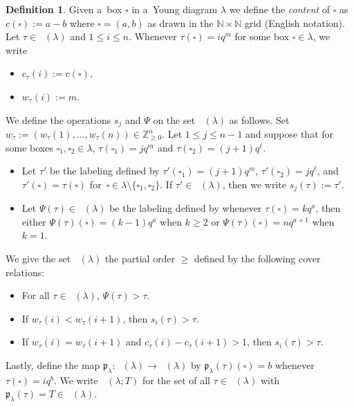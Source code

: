 \documentclass[pdftex]{sigma}
\numberwithin{equation}{section}
\theoremstyle{definition}
\newtheorem{Definition}[Theorem]{Definition}
\DeclareMathOperator{\RYT}{\mathrm{RYT}_{\geq 0}}
\DeclareMathOperator{\PSYT}{\mathrm{PSYT}_{\geq 0}}
\begin{document}
\begin{Definition}\label{ordering and operations on tableaux defs}
Given a~box $\square$ in a~Young diagram $\lambda$ we define the \textit{content} of $\square$ as $c(\square) := a-b$ where $\square = (a,b)$ as drawn in the $\mathbb{N}\times \mathbb{N}$ grid (English notation). Let $\tau \in \PSYT(\lambda)$ and $1\leq i\leq n$. Whenever $\tau(\square) = iq^{m}$ for some box $\square \in \lambda$, we write
\begin{itemize}
\itemsep=0pt
 \item $c_{\tau}(i):= c(\square)$,
 \item $w_{\tau}(i):= m$.
\end{itemize}

We define the operations $s_j$ and $\Psi$ on the set $\PSYT(\lambda)$ as follows. Set $w_{\tau}:= (w_{\tau}(1),\dots,\allowbreak w_{\tau}(n)) \in \mathbb{Z}^{n}_{\geq0}$. Let $1\leq j \leq n-1$ and suppose that for some boxes $\square_1,\square_2 \in \lambda$, $\tau(\square_1) = jq^m$ and $\tau(\square_2) = (j+1)q^{\ell}$.
\begin{itemize}
\itemsep=0pt
 \item Let $\tau'$ be the labeling defined by $\tau'(\square_1) = (j+1)q^m$, $\tau'(\square_2) = jq^{\ell}$, and $\tau'(\square) = \tau(\square)$ for~${\square \in \lambda \setminus \{\square_1,\square_2\}}$. If $\tau' \in \PSYT(\lambda)$, then we write $s_j(\tau):= \tau'$.
 \item Let $\Psi(\tau) \in \PSYT(\lambda)$ be the labeling defined by whenever $\tau(\square) = kq^a$, then either $\Psi(\tau)(\square) = (k-1)q^a$ when $k \geq 2$ or $\Psi(\tau)(\square) = nq^{a+1}$ when $k = 1$.
\end{itemize}

We give the set $\PSYT(\lambda)$ the partial order $\geq$ defined by the following cover relations:
\begin{itemize}
\itemsep=0pt
 \item For all $\tau \in \PSYT(\lambda)$, $\Psi(\tau) > \tau$.
 \item If $w_{\tau}(i)<w_{\tau}(i+1)$, then $s_i(\tau) > \tau$.
 \item If $w_{\tau}(i) = w_{\tau}(i+1)$ and $c_{\tau}(i)-c_{\tau}(i+1) > 1$, then $s_i(\tau) > \tau$.
\end{itemize}


Lastly, define the map $\mathfrak{p}_{\lambda}\colon \PSYT(\lambda) \rightarrow \RYT(\lambda)$ by $\mathfrak{p}_{\lambda}(\tau)(\square) = b$ whenever $\tau(\square) = iq^b$. We write $\PSYT(\lambda;T)$ for the set of all $\tau \in \PSYT(\lambda)$ with $\mathfrak{p}_{\lambda}(\tau) = T \in \RYT(\lambda)$.


\end{Definition}
\end{document}
